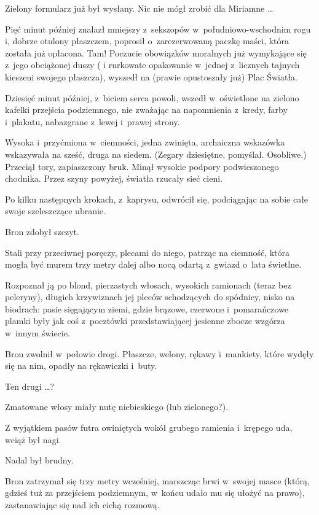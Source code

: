 \documentclass[oneside,polish,11pt,rmheadings]{mwbk}
\begin{document}
Zielony formularz już był wysłany. Nic nie mógł zrobić dla Miriamne \ldots  

Pięć minut później znalazł mniejszy z~sekszopów w~południowo-wschodnim rogu i, dobrze otulony płaszczem, poprosił o~zarezerwowaną paczkę maści, która została już opłacona. Tam! Poczucie obowiązków moralnych już wymykające się z~jego obciążonej duszy ( i rurkowate opakowanie w~jednej z~licznych tajnych kieszeni swojego płaszcza), wyszedł na (prawie opustoszały już) Plac Światła. 

Dziesięć minut później, z~biciem serca powoli, wszedł w~oświetlone na zielono kafelki przejścia podziemnego, nie zważając na napomnienia z~kredy, farby i~plakatu, nabazgrane z~lewej i~prawej strony. 

Wysoka i~przyćmiona w~ciemności, jedna zwinięta, archaiczna wskazówka wskazywała na sześć, druga na siedem. (Zegary dziesiętne, pomyślał. Osobliwe.) Przeciął tory, zapiaszczony bruk. Minął wysokie podpory podwieszonego chodnika. Przez szyny powyżej, światła rzucały sieć cieni. 

Po kilku następnych krokach, z~kaprysu, odwrócił się, podciągając na sobie całe swoje szeleszczące ubranie. 

Bron zdobył szczyt. 

Stali przy przeciwnej poręczy, plecami do niego, patrząc na ciemność, która mogła być murem trzy metry dalej albo nocą odartą z~gwiazd o~lata świetlne. 

Rozpoznał ją po blond, pierzastych włosach, wysokich ramionach (teraz bez peleryny), długich krzywiznach jej pleców schodzących do spódnicy, nisko na biodrach: pasie sięgającym ziemi, gdzie brązowe, czerwone i~pomarańczowe plamki były jak coś z~pocztówki przedstawiającej jesienne zbocze wzgórza w~innym świecie. 

Bron zwolnił w~połowie drogi. Płaszcze, welony, rękawy i~mankiety, które wydęły się na nim, opadły na rękawiczki i~buty. 

Ten drugi \ldots ? 

Zmatowane włosy miały nutę niebieskiego (lub zielonego?). 

Z wyjątkiem pasów futra owiniętych wokół grubego ramienia i~krępego uda, wciąż był nagi. 

Nadal był brudny. 

Bron zatrzymał się trzy metry wcześniej, marszcząc brwi w~swojej masce (którą, gdzieś tuż za przejściem podziemnym, w~końcu udało mu się ułożyć na prawo), zastanawiając się nad ich cichą rozmową. 
\end{document}

